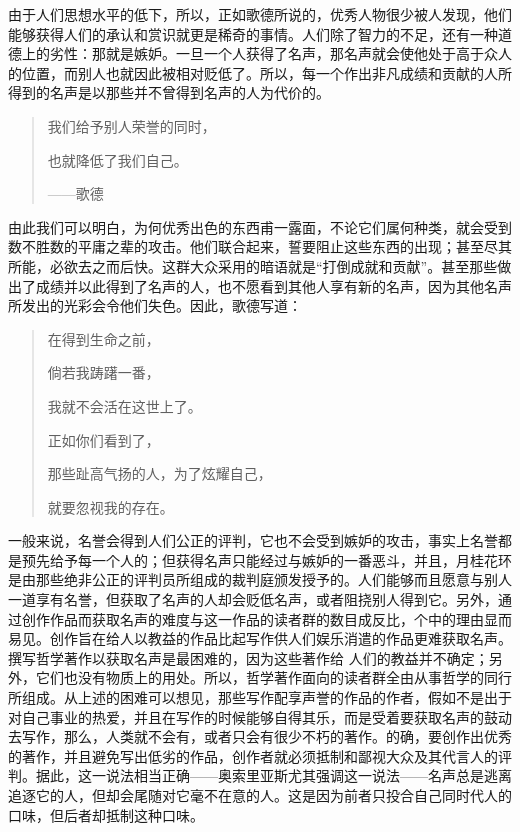 \documentclass[12pt,oneside]{book}
\begin{document}
由于人们思想水平的低下，所以，正如歌德所说的，优秀人物很少被人发现，他们能够获得人们的承认和赏识就更是稀奇的事情。人们除了智力的不足，还有一种道德上的劣性：那就是嫉妒。一旦一个人获得了名声，那名声就会使他处于高于众人的位置，而别人也就因此被相对贬低了。所以，每一个作出非凡成绩和贡献的人所得到的名声是以那些并不曾得到名声的人为代价的。 

 
\begin{quotation}
我们给予别人荣誉的同时， 

也就降低了我们自己。 

——歌德 
\end{quotation}


由此我们可以明白，为何优秀出色的东西甫一露面，不论它们属何种类，就会受到数不胜数的平庸之辈的攻击。他们联合起来，誓要阻止这些东西的出现；甚至尽其所能，必欲去之而后快。这群大众采用的暗语就是“打倒成就和贡献”。甚至那些做出了成绩并以此得到了名声的人，也不愿看到其他人享有新的名声，因为其他名声所发出的光彩会令他们失色。因此，歌德写道： 

 
\begin{quotation}
在得到生命之前， 

倘若我踌躇一番， 

我就不会活在这世上了。 

正如你们看到了， 

那些趾高气扬的人，为了炫耀自己， 

就要忽视我的存在。 
\end{quotation}


一般来说，名誉会得到人们公正的评判，它也不会受到嫉妒的攻击，事实上名誉都是预先给予每一个人的；但获得名声只能经过与嫉妒的一番恶斗，并且，月桂花环是由那些绝非公正的评判员所组成的裁判庭颁发授予的。人们能够而且愿意与别人一道享有名誉，但获取了名声的人却会贬低名声，或者阻挠别人得到它。另外，通过创作作品而获取名声的难度与这一作品的读者群的数目成反比，个中的理由显而易见。创作旨在给人以教益的作品比起写作供人们娱乐消遣的作品更难获取名声。撰写哲学著作以获取名声是最困难的，因为这些著作给
人们的教益并不确定；另外，它们也没有物质上的用处。所以，哲学著作面向的读者群全由从事哲学的同行所组成。从上述的困难可以想见，那些写作配享声誉的作品的作者，假如不是出于对自己事业的热爱，并且在写作的时候能够自得其乐，而是受着要获取名声的鼓动去写作，那么，人类就不会有，或者只会有很少不朽的著作。的确，要创作出优秀的著作，并且避免写出低劣的作品，创作者就必须抵制和鄙视大众及其代言人的评判。据此，这一说法相当正确——奥索里亚斯尤其强调这一说法——名声总是逃离追逐它的人，但却会尾随对它毫不在意的人。这是因为前者只投合自己同时代人的口味，但后者却抵制这种口味。 
\end{document}
